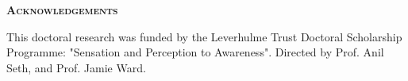 \pagestyle{empty}%
\begin{center}
	\Huge \textsc{\textbf{Acknowledgements}}
	\hrulefill
\end{center}



This doctoral research was funded by the Leverhulme Trust Doctoral Scholarship Programme: "Sensation and Perception to Awareness". Directed by Prof. Anil Seth, and Prof. Jamie Ward.
